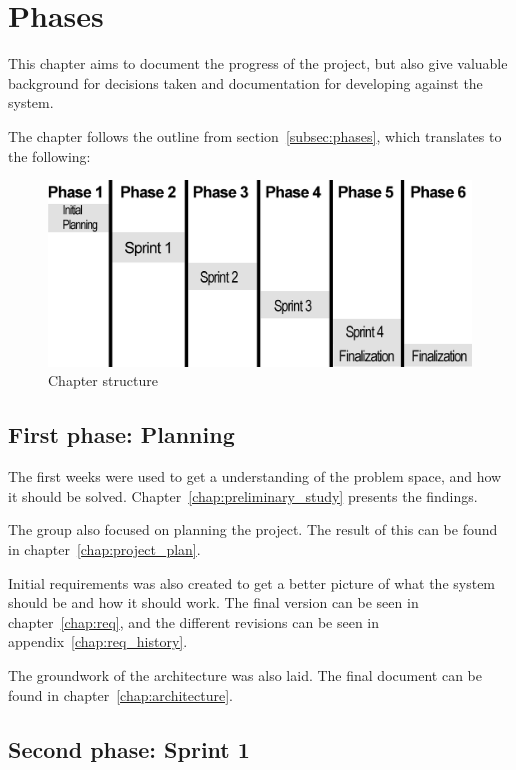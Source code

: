 \documentclass[11pt]{book}
\begin{document}

\chapter{Phases}
This chapter aims to document the progress of the project, but also give valuable background for decisions taken and documentation for developing against the system.

The chapter follows the outline from section~\ref{subsec:phases}, which translates to the following:
\begin{figure}[H]
    \centering
    \includegraphics[width=1.0\textwidth]{Figures/Phases/phases.png}
    \caption{Chapter structure}
    \label{fig:phases_structure}
\end{figure}

\section{First phase: Planning}
The first weeks were used to get a understanding of the problem space, and how it should be solved. Chapter~\ref{chap:preliminary_study} presents the findings.

The group also focused on planning the project. The result of this can be found in chapter~\ref{chap:project_plan}.

Initial requirements was also created to get a better picture of what the system should be and how it should work. The final version can be seen in chapter~\ref{chap:req}, and the different revisions can be seen in appendix~\ref{chap:req_history}.

The groundwork of the architecture was also laid. The final document can be found in chapter~\ref{chap:architecture}.

\section{Second phase: Sprint 1}
\end{document}
